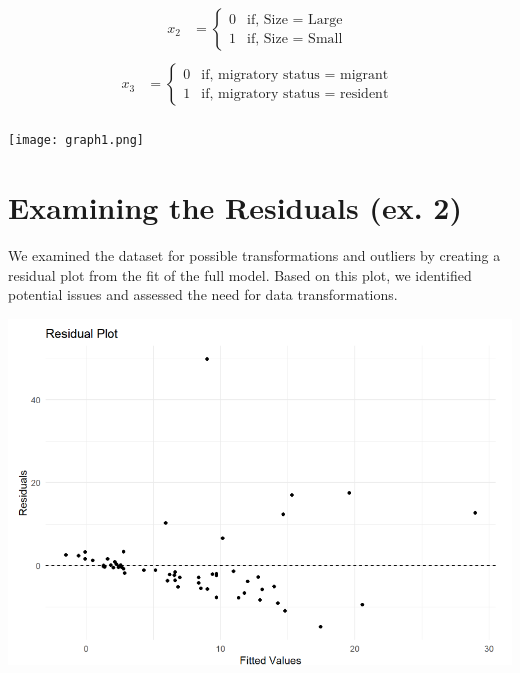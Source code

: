 \documentclass{article}
\begin{document}
\[\begin{aligned} 
        x_2 & = 
         \begin{cases}
             0 &  \text{if, Size  = Large }\\
             1 &  \text{if, Size = Small }   
         \end{cases}\\[3pt]
          \label{equ:yannibel}
       \end{aligned} 
       \]
\[\begin{aligned} 
        x_3 & = 
         \begin{cases}
             0 &  \text{if, migratory status  = migrant }\\
             1 &  \text{if, migratory status  = resident }   
         \end{cases}\\[3pt]
          \label{equ:yannibel}
       \end{aligned} 
       \]
\begin{center}
\texttt{[image: graph1.png]}
\end{center}



\section{Examining the Residuals (ex. 2)}

We examined the dataset for possible transformations and outliers by creating a residual plot from the fit of the full model. Based on this plot, we identified potential issues and assessed the need for data transformations.

\begin{center}
\includegraphics[scale=0.5]{graphs/residual.png}
\end{center}
\end{document}
